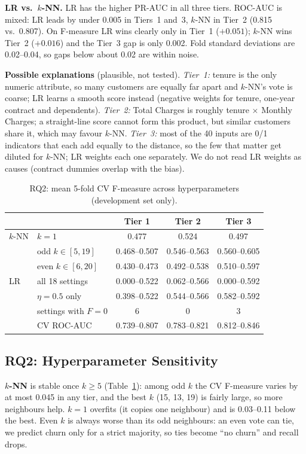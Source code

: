 \documentclass[sigconf,nonacm]{acmart}
\begin{document}
\textbf{LR vs.\ $k$-NN.} LR has the higher PR-AUC in all three tiers. ROC-AUC is mixed: LR leads by under 0.005 in Tiers~1 and~3, $k$-NN in Tier~2 (0.815 vs.\ 0.807). On F-measure LR wins clearly only in Tier~1 ($+0.051$); $k$-NN wins Tier~2 ($+0.016$) and the Tier~3 gap is only 0.002. Fold standard deviations are 0.02--0.04, so gaps below about 0.02 are within noise.

\textbf{Possible explanations} (plausible, not tested). \emph{Tier~1:} tenure is the only numeric attribute, so many customers are equally far apart and $k$-NN's vote is coarse; LR learns a smooth score instead (negative weights for tenure, one-year contract and dependents). \emph{Tier~2:} Total Charges is roughly tenure $\times$ Monthly Charges; a straight-line score cannot form this product, but similar customers share it, which may favour $k$-NN. \emph{Tier~3:} most of the 40 inputs are 0/1 indicators that each add equally to the distance, so the few that matter get diluted for $k$-NN; LR weights each one separately. We do not read LR weights as causes (contract dummies overlap with the bias).

\begin{table}[t]
\caption{RQ2: mean 5-fold CV F-measure across hyperparameters (development set only).}\label{tab:rq2}
\small\setlength{\tabcolsep}{1.8pt}
\begin{tabular}{@{}llccc@{}}
\toprule
 & & Tier 1 & Tier 2 & Tier 3\\
\midrule
$k$-NN & $k=1$ & 0.477 & 0.524 & 0.497\\
 & odd $k\in[5,19]$ & 0.468--0.507 & 0.546--0.563 & 0.560--0.605\\
 & even $k\in[6,20]$ & 0.430--0.473 & 0.492--0.538 & 0.510--0.597\\
\midrule
LR & all 18 settings & 0.000--0.522 & 0.062--0.566 & 0.000--0.592\\
 & $\eta=0.5$ only & 0.398--0.522 & 0.544--0.566 & 0.582--0.592\\
 & settings with $F{=}0$ & 6 & 0 & 3\\
 & CV ROC-AUC & 0.739--0.807 & 0.783--0.821 & 0.812--0.846\\
\bottomrule
\end{tabular}
\end{table}

\subsection{RQ2: Hyperparameter Sensitivity}
\textbf{$k$-NN} is stable once $k\ge5$ (Table~\ref{tab:rq2}): among odd $k$ the CV F-measure varies by at most 0.045 in any tier, and the best $k$ (15, 13, 19) is fairly large, so more neighbours help. $k=1$ overfits (it copies one neighbour) and is 0.03--0.11 below the best. Even $k$ is always worse than its odd neighbours: an even vote can tie, we predict churn only for a strict majority, so ties become ``no churn'' and recall drops.
\end{document}

